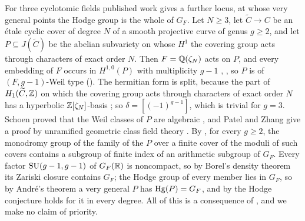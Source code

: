 \begin{remark}\label{rem:quarticprym}
For three cyclotomic fields published work gives a further locus, at whose
very general points the Hodge group is the whole of $G_{F}$. Let $N\ge3$,
let $\widetilde C\to C$ be an \'etale cyclic cover of degree $N$ of a smooth
projective curve of genus
$g\ge2$, and let $P\subseteq J(\widetilde C)$ be the abelian subvariety on
whose $H^{1}$ the covering group acts through characters of exact order $N$.
Then $F=\mathbb{Q}(\zeta_{N})$ acts on $P$, and every embedding of $F$ occurs in
$H^{1,0}(P)$ with multiplicity $g-1$ \cite[Lemma~1.6a]{Sch88},
\cite[Lemma~5.1]{PZ25}, so $P$ is of $(F,g-1)$-Weil type
(\cite[Remark~17.2]{paperI}). The hermitian form is split, because the part of
$H_{1}(\widetilde C,\mathbb{Z})$ on which the covering group acts through
characters of exact order $N$ has a hyperbolic $\mathbb{Z}[\zeta_{N}]$-basis
\cite[Proposition~2.2]{Loo97}; so $\delta=[(-1)^{g-1}]$, which is trivial for
$g=3$. Schoen proved that the Weil classes of $P$ are algebraic
\cite[Theorem~2.0 with $r=0$, Corollary~3.1]{Sch88}, and Patel and Zhang give
a proof by unramified geometric class field theory
\cite[Theorems~1.1, 1.2 and~5.3, Remark~3.7]{PZ25}. By
\cite[Theorem~2.4]{Loo97}, for every $g\ge2$, the monodromy group of the
family of the $P$ over a finite cover of the moduli of such covers contains a
subgroup of finite index of an arithmetic subgroup of $G_{F}$. Every factor
$\operatorname{SU}(g-1,g-1)$ of $G_{F}(\mathbb{R})$ is noncompact, so by Borel's density theorem
\cite{Bor60} its Zariski closure contains $G_{F}$; the Hodge group of every
member lies in $G_{F}$, so by Andr\'e's theorem \cite[Theorem~1]{And92} a very
general $P$ has $\operatorname{Hg}(P)=G_{F}$, and by \cite[Proposition~17.3(iii)]{paperI} the Hodge
conjecture holds for it in every degree. All of this is a consequence of
\cite{Sch88,Loo97,And92}, and we make no claim of priority.


\end{remark}

